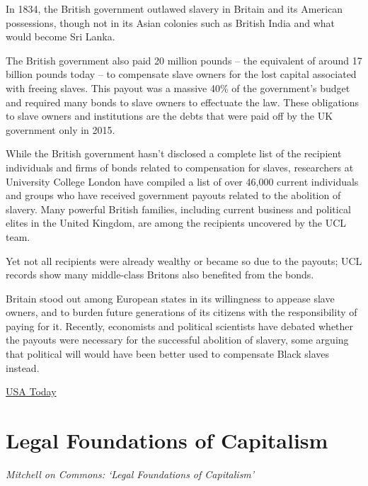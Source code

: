 \documentclass[
]{book}
\begin{document}
In 1834, the British government outlawed slavery in Britain and its American possessions, though not in its Asian colonies such as British India and what would become Sri Lanka.

The British government also paid 20 million pounds -- the equivalent of around 17 billion pounds today -- to compensate slave owners for the lost capital associated with freeing slaves. This payout was a massive 40\% of the government's budget and required many bonds to slave owners to effectuate the law.
These obligations to slave owners and institutions are the debts that were paid off by the UK government only in 2015.

While the British government hasn't disclosed a complete list of the recipient individuals and firms of bonds related to compensation for slaves, researchers at University College London have compiled a list of over 46,000 current individuals and groups who have received government payouts related to the abolition of slavery. Many powerful British families, including current business and political elites in the United Kingdom, are among the recipients uncovered by the UCL team.

Yet not all recipients were already wealthy or became so due to the payouts; UCL records show many middle-class Britons also benefited from the bonds.

Britain stood out among European states in its willingness to appease slave owners, and to burden future generations of its citizens with the responsibility of paying for it.
Recently, economists and political scientists have debated whether the payouts were necessary for the successful abolition of slavery, some arguing that political will would have been better used to compensate Black slaves instead.

\href{https://eu.usatoday.com/story/news/factcheck/2020/06/30/fact-check-u-k-paid-off-debts-slave-owning-families-2015/3283908001/}{USA Today}

\hypertarget{legal-foundations-of-capitalism}{%
\chapter{Legal Foundations of Capitalism}\label{legal-foundations-of-capitalism}}

\emph{Mitchell on Commons: `Legal Foundations of Capitalism'}
\end{document}
